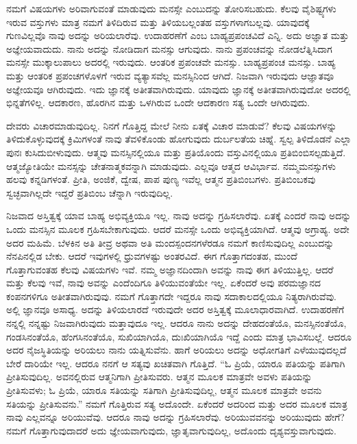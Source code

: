 ನಮಗೆ ವಿಷಯಗಳು ಅರಿವಾಗುವಂತೆ ಮಾಡುವುದು ಮನಸ್ಸೇ ಎಂಬುದನ್ನು ತೋರಿಸಬಹುದು. ಕೆಲವು ವೈಶಿಷ್ಟ್ಯಗಳು ಇರುವ ವಸ್ತುಗಳು ಮಾತ್ರ ನಮಗೆ ತಿಳಿದಿರುವ ಮತ್ತು ತಿಳಿಯಬಲ್ಲಂತಹ ವಸ್ತುಗಳಾಗಬಲ್ಲವು. ಯಾವುದಕ್ಕೆ ಗುಣವಿಲ್ಲವೊ ನಾವು ಅದನ್ನು ಅರಿಯಲಾರೆವು. ಉದಾಹರಣೆಗೆ  ಎಂಬ ಬಾಹ್ಯಪ್ರಪಂಚವಿದೆ ಎನ್ನಿ. ಅದು ಅಜ್ಞಾತ ಮತ್ತು ಅಜ್ಞೇಯವಾದುದು. ನಾನು ಅದನ್ನು ನೋಡಿದಾಗ  ಮನಸ್ಸು ಆಗುವುದು. ನಾನು ಪ್ರಪಂಚವನ್ನು ನೋಡಲೆತ್ನಿಸಿದಾಗ ಮನಸ್ಸೇ ಮುಕ್ಕಾಲುಪಾಲು ಅದರಲ್ಲಿ ಇರುವುದು. ಆಂತರಿಕ ಪ್ರಪಂಚವೇ  ಮನಸ್ಸು. ಬಾಹ್ಯಪ್ರಪಂಚ  ಮನಸ್ಸು. ಬಾಹ್ಯ ಮತ್ತು ಆಂತರಿಕ ಪ್ರಪಂಚಗಳೊಳಗೆ ಇರುವ ವ್ಯತ್ಯಾಸವೆಲ್ಲ ಮನಸ್ಸಿನಿಂದ ಆಗಿದೆ. ನಿಜವಾಗಿ ಇರುವುದು ಆಜ್ಞಾತವೂ ಅಜ್ಞೇಯವೂ ಆಗಿರುವುದು. ಇದು ಜ್ಞಾನಕ್ಕೆ ಅತೀತವಾಗಿರುವುದು. ಯಾವುದು ಜ್ಞಾನಕ್ಕೆ ಅತೀತವಾಗಿರುವುದೋ ಅದರಲ್ಲಿ ಭಿನ್ನತೆಗಳಿಲ್ಲ. ಆದಕಾರಣ, ಹೊರಗಿನ  ಮತ್ತು  ಒಳಗಿರುವ ಒಂದೇ ಆದಕಾರಣ ಸತ್ಯ ಒಂದೇ ಆಗಿರುವುದು.

ದೇವರು ವಿಚಾರಮಾಡುವುದಿಲ್ಲ. ನಿನಗೆ ಗೊತ್ತಿದ್ದ ಮೇಲೆ ನೀನು ಏತಕ್ಕೆ ವಿಚಾರ ಮಾಡುವೆ? ಕೆಲವು ವಿಷಯಗಳನ್ನು ತಿಳಿದುಕೊಳ್ಳುವುದಕ್ಕೆ ಕ್ರಿಮಿಗಳಂತೆ ನಾವು ತೆವಳಿಕೊಂಡು ಹೋಗುವುದು ದುರ್ಬಲತೆಯ ಚಿಹ್ನೆ. ಸ್ವಲ್ಪ ತಿಳಿದೊಡನೆ ಎಲ್ಲಾ ಪುನಃ ಕುಸಿದುಬೀಳುವುದು. ಆತ್ಮವು ಮನಸ್ಸಿನಲ್ಲಿಯೂ ಮತ್ತು ಪ್ರತಿಯೊಂದು ವಸ್ತುವಿನಲ್ಲಿಯೂ ಪ್ರತಿಬಿಂಬಿಸಲ್ಪಡುತ್ತಿದೆ. ಆತ್ಮಜ್ಯೋತಿಯೇ ಮನಸ್ಸನ್ನು ಚೇತನಾತ್ಮಕವನ್ನಾಗಿ ಮಾಡುವುದು. ಎಲ್ಲವೂ ಆತ್ಮದ ಆವಿರ್ಭಾವ. ನಮ್ಮಮನಸ್ಸುಗಳು ಹಲವು ಕನ್ನಡಿಗಳಂತೆ. ಪ್ರೀತಿ, ಅಂಜಿಕೆ, ದ್ವೇಷ, ಪಾಪ ಪುಣ್ಯ ಇವೆಲ್ಲ ಆತ್ಮನ ಪ್ರತಿಬಿಂಬಗಳು. ಪ್ರತಿಬಿಂಬಕವು ಸ್ವಚ್ಛವಾಗಿಲ್ಲದೇ ಇದ್ದರೆ ಪ್ರತಿಬಿಂಬ ಚೆನ್ನಾಗಿ ಇರುವುದಿಲ್ಲ.

ನಿಜವಾದ ಅಸ್ತಿತ್ವಕ್ಕೆ ಯಾವ ಬಾಹ್ಯ ಅಭಿವ್ಯಕ್ತಿಯೂ ಇಲ್ಲ. ನಾವು ಅದನ್ನು ಗ್ರಹಿಸಲಾರೆವು. ಏತಕ್ಕೆ ಎಂದರೆ ನಾವು ಅದನ್ನು ಒಂದು ಮನಸ್ಸಿನ ಮೂಲಕ ಗ್ರಹಿಸಬೇಕಾಗುವುದು. ಆದರೆ ಮನಸ್ಸೇ ಒಂದು ಅಭಿವ್ಯಕ್ತಿಯಾಗಿದೆ. ಆತ್ಮವು ಅಗ್ರಾಹ್ಯ. ಅದೇ ಅದರ ಮಹಿಮೆ. ಬೆಳಕಿನ ಅತಿ ತೀವ್ರ ಅಥವಾ ಅತಿ ಮಂದಸ್ಪಂದನಗಳೆರಡೂ ನಮಗೆ ಕಾಣಿಸುವುದಿಲ್ಲ ಎಂಬುದನ್ನು ನೆನಪಿನಲ್ಲಿಡ ಬೇಕು. ಆದರೆ ಇವುಗಳಲ್ಲಿ ಧ್ರುವಗಳಷ್ಟು ಅಂತರವಿದೆ. ಈಗ ಗೊತ್ತಾಗದಂತಹ, ಮುಂದೆ ಗೊತ್ತಾಗುವಂತಹ ಕೆಲವು ವಿಷಯಗಳು ಇವೆ. ನಮ್ಮ ಅಜ್ಞಾನದಿಂದಾಗಿ ಅವನ್ನು ನಾವು ಈಗ ತಿಳಿಯುತ್ತಿಲ್ಲ. ಆದರೆ ಮತ್ತು ಕೆಲವು ಇವೆ, ನಾವು ಅವನ್ನು ಎಂದೆಂದಿಗೂ ತಿಳಿಯುವಂತೆಯೇ ಇಲ್ಲ. ಏಕೆಂದರೆ ಅವು ಪರಮಜ್ಞಾನದ ಕಂಪನಗಳಿಗೂ ಅತೀತವಾಗಿರುವುವು. ನಮಗೆ ಗೊತ್ತಾಗದೇ ಇದ್ದರೂ ನಾವು ಸದಾಕಾಲದಲ್ಲಿಯೂ ನಿತ್ಯರಾಗಿರುವೆವು. ಅಲ್ಲಿ ಜ್ಞಾನವೂ ಅಸಾಧ್ಯ. ಅದನ್ನು ತಿಳಿಯಲಾರದೆ ಇರುವುದೇ ಅದರ ಅಸ್ತಿತ್ವಕ್ಕೆ ಮೂಲಾಧಾರವಾಗಿದೆ. ಉದಾಹರಣೆಗೆ ನನ್ನಲ್ಲಿ ನನ್ನಷ್ಟು ನಿಜವಾಗಿರುವುದು ಮತ್ತಾವುದೂ ಇಲ್ಲ. ಆದರೂ ನಾನು ಅದನ್ನು ದೇಹದಂತೆಯೊ, ಮನಸ್ಸಿನಂತೆಯೊ, ಗಂಡಸಿನಂತೆಯೊ, ಹೆಂಗಸಿನಂತೆಯೊ, ಸುಖಿಯಾಗಿಯೊ, ದುಃಖಿಯಾಗಿಯೊ ಇದ್ದೆ ಎಂದು ಮಾತ್ರ ಭಾವಿಸಬಲ್ಲೆ. ಆದರೂ ಅದರ ನೈಜಸ್ಥಿತಿಯನ್ನು ಅರಿಯಲು ನಾನು ಯತ್ನಿಸುವೆನು. ಹಾಗೆ ಅರಿಯಲು ಅದನ್ನು ಅಧೋಗತಿಗೆ ಎಳೆಯುವುದಲ್ಲದೆ ಬೇರೆ ದಾರಿಯೇ ಇಲ್ಲ. ಆದರೂ ನನಗೆ ಆ ಸತ್ಯವು ಖಚಿತವಾಗಿ ಗೊತ್ತಿದೆ. “ಓ ಪ್ರಿಯೆ, ಯಾರೂ ಪತಿಯನ್ನು ಪತಿಗಾಗಿ ಪ್ರೀತಿಸುವುದಿಲ್ಲ. ಅವನಲ್ಲಿರುವ ಆತ್ಮನಿಗಾಗಿ ಪ್ರೀತಿಸುವರು. ಆತ್ಮನ ಮೂಲಕ ಮಾತ್ರವೇ ಅವಳು ಪತಿಯನ್ನು ಪ್ರೀತಿಸುವಳು; ಓ ಪ್ರಿಯೆ, ಯಾರೂ ಸತಿಯನ್ನು ಸತಿಗಾಗಿ ಪ್ರೀತಿಸುವುದಿಲ್ಲ, ಆತ್ಮನ ಮೂಲಕ ಮಾತ್ರವೇ ಅವನು ಸತಿಯನ್ನು ಪ್ರೀತಿಸುವನು.” ನಮಗೆ ಗೊತ್ತಿರುವ ಸತ್ಯ ಅದೊಂದೇ. ಏಕೆಂದರೆ ಅದರಿಂದ ಮತ್ತು ಅದರ ಮೂಲಕ ಮಾತ್ರ ನಾವು ಎಲ್ಲವನ್ನೂ ಅರಿಯುವೆವು. ಆದರೂ ನಾವು ಅದನ್ನು ಗ್ರಹಿಸಲಾರೆವು. ಅರಿಯುವವನನ್ನು ಅರಿಯುವುದು ಹೇಗೆ? ನಮಗೆ ಗೊತ್ತಾಗುವುದಾದರೆ ಅದು ಜ್ಞೇಯವಾಗುವುದು, ಜ್ಞಾತೃವಾಗುವುದಿಲ್ಲ, ಅದೊಂದು ದೃಶ್ಯವಸ್ತುವಾಗುವುದು.

